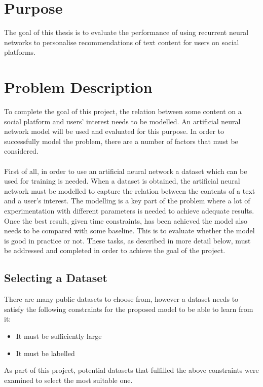 \section{Purpose}
The goal of this thesis is to evaluate the performance of using recurrent neural networks to personalise recommendations of text content for users on social platforms.

\section{Problem Description}
To complete the goal of this project, the relation between some content on a social platform and users' interest needs to be modelled. An artificial neural network model will be used and evaluated for this purpose. In order to successfully model the problem, there are a number of factors that must be considered.
\\\\
First of all, in order to use an artificial neural network a dataset which can be used for training is needed. When a dataset is obtained, the artificial neural network must be modelled to capture the relation between the contents of a text and a user's interest. The modelling is a key part of the problem where a lot of experimentation with different parameters is needed to achieve adequate results. Once the best result, given time constraints, has been achieved the model also needs to be compared with some baseline. This is to evaluate whether the model is good in practice or not. These tasks, as described in more detail below,  must be addressed and completed in order to achieve the goal of the project.

\subsection{Selecting a Dataset}\label{sec:select_dataset}
There are many public datasets to choose from, however a dataset needs to satisfy the following constraints for the proposed model to be able to learn from it: 
\vspace*{0.25cm}
\begin{itemize}
    \item It must be sufficiently large
    \item It must be labelled
\end{itemize}
\vspace*{0.25cm}
As part of this project, potential datasets that fulfilled the above constraints were examined to select the most suitable one.

